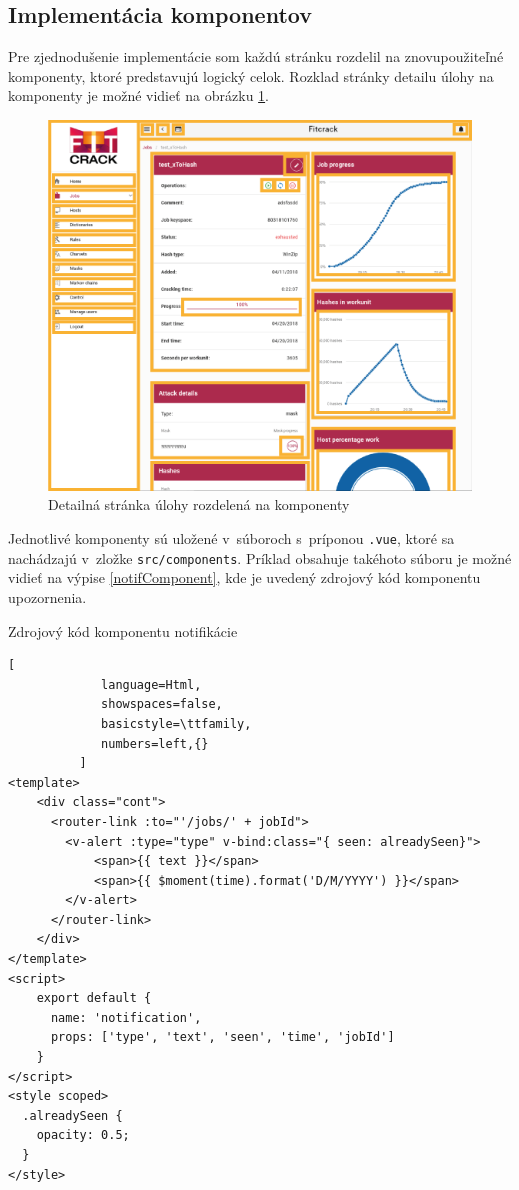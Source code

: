 \documentclass[slovak]{fitthesis}
\begin{document}
\subsection{Implementácia komponentov}
Pre zjednodušenie implementácie som každú stránku rozdelil na znovupoužiteľné komponenty, ktoré predstavujú logický celok. Rozklad stránky detailu úlohy na komponenty je možné vidieť na obrázku \ref{fig:komponenty}.
\begin{figure}[H]
    \centering
    \includegraphics[scale=0.45]{obrazky/komponenty.png}
    \caption{Detailná stránka úlohy rozdelená na komponenty}
    \label{fig:komponenty}
\end{figure}
\noindent
Jednotlivé komponenty sú uložené v~súboroch s~príponou \texttt{.vue}, ktoré sa nachádzajú v~zložke \texttt{src/components}. Príklad obsahuje takéhoto súboru je možné vidieť na výpise \ref{notifComponent}, kde je uvedený zdrojový kód komponentu upozornenia.
\begin{algorithm}[h]
  \caption{Zdrojový kód komponentu notifikácie}
  \label{notifComponent}
  \begin{lstlisting}[
             language=Html,
             showspaces=false,
             basicstyle=\ttfamily,
             numbers=left,{}
          ]
<template>
    <div class="cont">
      <router-link :to="'/jobs/' + jobId">
        <v-alert :type="type" v-bind:class="{ seen: alreadySeen}">
            <span>{{ text }}</span>
            <span>{{ $moment(time).format('D/M/YYYY') }}</span>
        </v-alert>
      </router-link>
    </div>
</template>
<script>
    export default {
      name: 'notification',
      props: ['type', 'text', 'seen', 'time', 'jobId']
    }
</script>
<style scoped>
  .alreadySeen {
    opacity: 0.5;
  }
</style>
  \end{lstlisting}
\end{algorithm}
\end{document}
